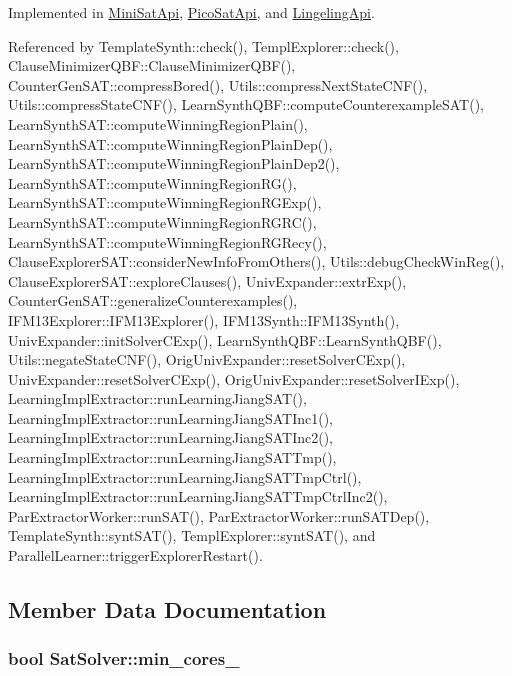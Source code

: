 Implemented in \hyperlink{classMiniSatApi_afe6f184e440ffe7f9b3a86045c15b450}{Mini\-Sat\-Api}, \hyperlink{classPicoSatApi_a5e32634944d14142ab0e2c4fdeb12d85}{Pico\-Sat\-Api}, and \hyperlink{classLingelingApi_a844da6cbdf38b7cc8abd0b1710350be2}{Lingeling\-Api}.



Referenced by Template\-Synth\-::check(), Templ\-Explorer\-::check(), Clause\-Minimizer\-Q\-B\-F\-::\-Clause\-Minimizer\-Q\-B\-F(), Counter\-Gen\-S\-A\-T\-::compress\-Bored(), Utils\-::compress\-Next\-State\-C\-N\-F(), Utils\-::compress\-State\-C\-N\-F(), Learn\-Synth\-Q\-B\-F\-::compute\-Counterexample\-S\-A\-T(), Learn\-Synth\-S\-A\-T\-::compute\-Winning\-Region\-Plain(), Learn\-Synth\-S\-A\-T\-::compute\-Winning\-Region\-Plain\-Dep(), Learn\-Synth\-S\-A\-T\-::compute\-Winning\-Region\-Plain\-Dep2(), Learn\-Synth\-S\-A\-T\-::compute\-Winning\-Region\-R\-G(), Learn\-Synth\-S\-A\-T\-::compute\-Winning\-Region\-R\-G\-Exp(), Learn\-Synth\-S\-A\-T\-::compute\-Winning\-Region\-R\-G\-R\-C(), Learn\-Synth\-S\-A\-T\-::compute\-Winning\-Region\-R\-G\-Recy(), Clause\-Explorer\-S\-A\-T\-::consider\-New\-Info\-From\-Others(), Utils\-::debug\-Check\-Win\-Reg(), Clause\-Explorer\-S\-A\-T\-::explore\-Clauses(), Univ\-Expander\-::extr\-Exp(), Counter\-Gen\-S\-A\-T\-::generalize\-Counterexamples(), I\-F\-M13\-Explorer\-::\-I\-F\-M13\-Explorer(), I\-F\-M13\-Synth\-::\-I\-F\-M13\-Synth(), Univ\-Expander\-::init\-Solver\-C\-Exp(), Learn\-Synth\-Q\-B\-F\-::\-Learn\-Synth\-Q\-B\-F(), Utils\-::negate\-State\-C\-N\-F(), Orig\-Univ\-Expander\-::reset\-Solver\-C\-Exp(), Univ\-Expander\-::reset\-Solver\-C\-Exp(), Orig\-Univ\-Expander\-::reset\-Solver\-I\-Exp(), Learning\-Impl\-Extractor\-::run\-Learning\-Jiang\-S\-A\-T(), Learning\-Impl\-Extractor\-::run\-Learning\-Jiang\-S\-A\-T\-Inc1(), Learning\-Impl\-Extractor\-::run\-Learning\-Jiang\-S\-A\-T\-Inc2(), Learning\-Impl\-Extractor\-::run\-Learning\-Jiang\-S\-A\-T\-Tmp(), Learning\-Impl\-Extractor\-::run\-Learning\-Jiang\-S\-A\-T\-Tmp\-Ctrl(), Learning\-Impl\-Extractor\-::run\-Learning\-Jiang\-S\-A\-T\-Tmp\-Ctrl\-Inc2(), Par\-Extractor\-Worker\-::run\-S\-A\-T(), Par\-Extractor\-Worker\-::run\-S\-A\-T\-Dep(), Template\-Synth\-::synt\-S\-A\-T(), Templ\-Explorer\-::synt\-S\-A\-T(), and Parallel\-Learner\-::trigger\-Explorer\-Restart().



\subsection{Member Data Documentation}
\hypertarget{classSatSolver_adfeecebfd09606c82b5c57cfe5aad813}{
\subsubsection[{min\-\_\-cores\-\_\-}]{\setlength{\rightskip}{0pt plus 5cm}bool Sat\-Solver\-::min\-\_\-cores\-\_\-\hspace{0.3cm}{\ttfamily [protected]}}}\label{classSatSolver_adfeecebfd09606c82b5c57cfe5aad813}


